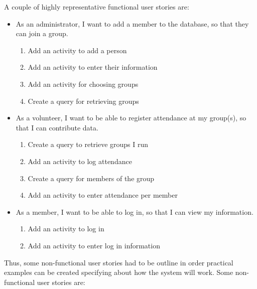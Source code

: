 \documentclass{l3proj}
\begin{document}
A couple of highly representative functional user stories are:
\begin{itemize}

\item As an administrator, I want to add a member to the database, so that they can join a group.

	\begin{enumerate}
	\item Add an activity to add a person
	
	\item Add an activity to enter their information

	\item Add an activity for choosing groups

	\item Create a query for retrieving groups
	\end{enumerate}
\item As a volunteer, I want to be able to register attendance at my group(s), so that I can contribute data.

	\begin{enumerate}
	\item Create a query to retrieve groups I run
	
	\item Add an activity to log attendance
	
	\item Create a query for members of the group
	
	\item Add an activity to enter attendance per member
	
	\end{enumerate}

\item As a member, I want to be able to log in, so that I can view my information.

	\begin{enumerate}
	
	\item Add an activity to log in
	\item Add an activity to enter log in information
	
	\end{enumerate}

\end{itemize}

Thus, some non-functional user stories had to be outline in order practical examples can be created specifying about how the system will work. Some non-functional user stories are:
\end{document}
